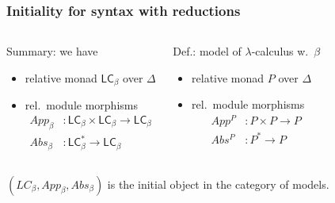 \documentclass[
serif,
mathsans,
]
{beamer}
\newcommand{\LC}{\mathsf{LC}}
\begin{document}
\begin{frame}
 \frametitle{Initiality for syntax with reductions}
 
 
 
 \begin{columns}
  \begin{block}{Summary: we have}
    \begin{itemize}
     \item relative monad $\LC_{\beta}$ over $\Delta$
     \item rel.\ module morphisms
     \vspace{-.5em}
               \begin{align*}
                    App_{\beta} &: \LC_{\beta} \times \LC_{\beta}  \to \LC_{\beta}\\
                    Abs_{\beta} &: \LC^*_{\beta} \to \LC_{\beta}
    \end{align*}
             
    \end{itemize}

  \end{block}
  
  \begin{block}{Def.: model of $\lambda$-calculus w.\ $\beta$}
    \begin{itemize}
     \item relative monad $P$ over $\Delta$
     \item rel.\ module morphisms
     \vspace{-.5em}
               \begin{align*}
                    App^P &: P \times P  \to P\\
                    Abs^P &: P^* \to P
    \end{align*}
    \end{itemize}
  \end{block}
  
 \end{columns}
 
 \begin{theorem}
    $(LC_{\beta}, App_{\beta}, Abs_{\beta})$ is the initial object in the category of models.
 \end{theorem}
 
\end{frame}
\end{document}

